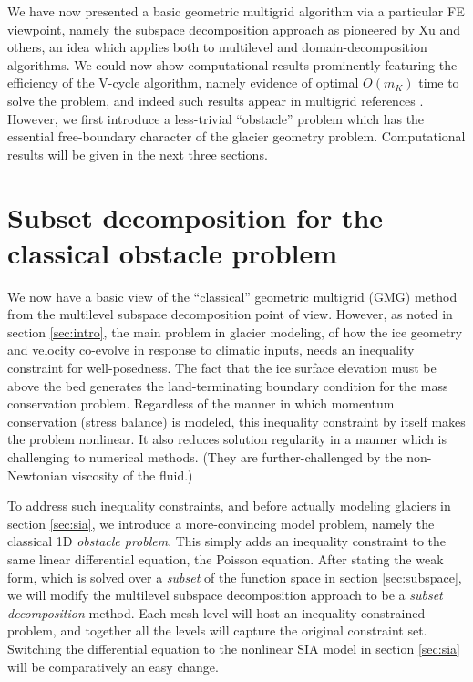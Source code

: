 \documentclass[letterpaper,final,12pt,reqno]{amsart}
\begin{document}
We have now presented a basic geometric multigrid algorithm via a particular FE viewpoint, namely the subspace decomposition approach as pioneered by Xu \cite{Xu1992} and others, an idea which applies both to multilevel and domain-decomposition algorithms.  We could now show computational results prominently featuring the efficiency of the V-cycle algorithm, namely evidence of optimal $O(m_K)$ time to solve the problem, and indeed such results appear in multigrid references \cite{Briggsetal2000,Bueler2021,Elmanetal2014,Trottenbergetal2001}.  However, we first introduce a less-trivial ``obstacle'' problem which has the essential free-boundary character of the glacier geometry problem.  Computational results will be given in the next three sections.


\section{Subset decomposition for the classical obstacle problem} \label{sec:obstacle}

We now have a basic view of the ``classical'' geometric multigrid (GMG) method from the multilevel subspace decomposition point of view.  However, as noted in section \ref{sec:intro}, the main problem in glacier modeling, of how the ice geometry and velocity co-evolve in response to climatic inputs, needs an inequality constraint for well-posedness.  The fact that the ice surface elevation must be above the bed generates the land-terminating boundary condition for the mass conservation problem.  Regardless of the manner in which momentum conservation (stress balance) is modeled, this inequality constraint by itself makes the problem nonlinear.  It also reduces solution regularity in a manner which is challenging to numerical methods.  (They are further-challenged by the non-Newtonian viscosity of the fluid.)

To address such inequality constraints, and before actually modeling glaciers in section \ref{sec:sia}, we introduce a more-convincing model problem, namely the classical 1D \emph{obstacle problem}.  This simply adds an inequality constraint to the same linear differential equation, the Poisson equation.  After stating the weak form, which is solved over a \emph{subset} of the function space in section \ref{sec:subspace}, we will modify the multilevel subspace decomposition approach to be a \emph{subset decomposition} method.  Each mesh level will host an inequality-constrained problem, and together all the levels will capture the original constraint set.  Switching the differential equation to the nonlinear SIA model in section \ref{sec:sia} will be comparatively an easy change.
\end{document}
